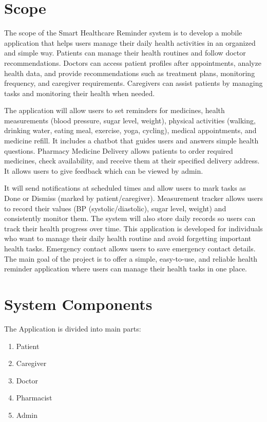 \documentclass[12pt, a4paper, oneside]{report}
\begin{document}
\section{Scope}
\label{sec:scope}

The scope of the Smart Healthcare Reminder system is to develop a mobile application that helps users manage their daily health activities in an organized and simple way. Patients can manage their health routines and follow doctor recommendations. Doctors can access patient profiles after appointments, analyze health data, and provide recommendations such as treatment plans, monitoring frequency, and caregiver requirements. Caregivers can assist patients by managing tasks and monitoring their health when needed.

The application will allow users to set reminders for medicines, health measurements (blood pressure, sugar level, weight), physical activities (walking, drinking water, eating meal, exercise, yoga, cycling), medical appointments, and medicine refill. It includes a chatbot that guides users and answers simple health questions. Pharmacy Medicine Delivery allows patients to order required medicines, check availability, and receive them at their specified delivery address. It allows users to give feedback which can be viewed by admin.

It will send notifications at scheduled times and allow users to mark tasks as Done or Dismiss (marked by patient/caregiver). Measurement tracker allows users to record their values (BP (systolic/diastolic), sugar level, weight) and consistently monitor them. The system will also store daily records so users can track their health progress over time. This application is developed for individuals who want to manage their daily health routine and avoid forgetting important health tasks. Emergency contact allows users to save emergency contact details. The main goal of the project is to offer a simple, easy-to-use, and reliable health reminder application where users can manage their health tasks in one place.

\section{System Components}
\label{sec:system-components}

The Application is divided into main parts:
\begin{enumerate}
    \item Patient
    \item Caregiver
    \item Doctor
    \item Pharmacist
    \item Admin
\end{enumerate}
\end{document}
